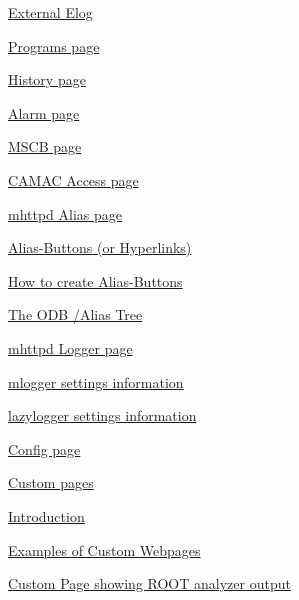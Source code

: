 \begin{TabularC}{2}
\begin{TabularC}{2}
\begin{DoxyItemize}
\begin{DoxyItemize}
\begin{DoxyItemize}
\begin{DoxyItemize}
\begin{DoxyItemize}
\begin{DoxyItemize}
\end{DoxyItemize}
\item \hyperlink{RC_mhttpd_Elog_page_RC_mhttpd_External_Elog}{External Elog} 
\end{DoxyItemize}
\end{DoxyItemize}
\item \hyperlink{RC_mhttpd_Program_page}{Programs page} 
\item \hyperlink{RC_mhttpd_History_page}{History page} 
\item \hyperlink{RC_mhttpd_Alarm_page}{Alarm page} 
\item \hyperlink{RC_mhttpd_MSCB_page}{MSCB page} 
\item \hyperlink{RC_mhttpd_CNAF_page}{CAMAC Access page} 
\item \hyperlink{RC_mhttpd_Alias_page}{mhttpd Alias page} 
\begin{DoxyItemize}
\item \hyperlink{RC_mhttpd_Alias_page_RC_mhttpd_alias_buttons}{Alias-\/Buttons (or Hyperlinks)} 
\item \hyperlink{RC_mhttpd_Alias_page_RC_mhttpd_alias_define}{How to create Alias-\/Buttons} 
\begin{DoxyItemize}
\item \hyperlink{RC_mhttpd_Alias_page_RC_odb_alias_tree}{The ODB /Alias Tree} 
\end{DoxyItemize}
\end{DoxyItemize}
\item \hyperlink{RC_mhttpd_Logger_page}{mhttpd Logger page} 
\begin{DoxyItemize}
\item \hyperlink{RC_mhttpd_Logger_page_RC_mhttpd_Logger_mlogger}{mlogger settings information} 
\item \hyperlink{RC_mhttpd_Logger_page_RC_mhttpd_Logger_lazylogger}{lazylogger settings information} 
\end{DoxyItemize}
\item \hyperlink{RC_mhttpd_Config_page}{Config page} 
\item \hyperlink{RC_mhttpd_Custom_page}{Custom pages} 
\begin{DoxyItemize}
\item \hyperlink{RC_mhttpd_Custom_page_RC_mhttpd_custom_intro}{Introduction} 
\item \hyperlink{RC_mhttpd_Custom_page_RC_Example_Custom_Webpages}{Examples of Custom Webpages} 
\item \hyperlink{RC_ROOT_analyzer_page}{Custom Page showing ROOT analyzer output} 

\end{DoxyItemize}
\end{DoxyItemize}
\end{DoxyItemize}
\end{DoxyItemize}
\end{TabularC}
\end{TabularC}
